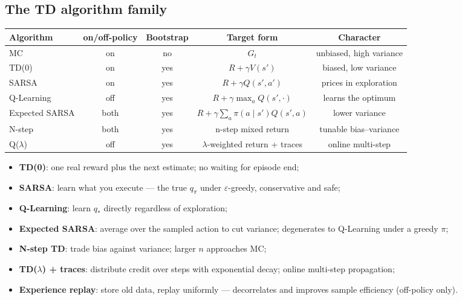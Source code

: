 \documentclass{article}
\begin{document}
\subsection*{The TD algorithm family}

\begin{center}
\small
\begin{tabular}{lcccc}
\toprule
Algorithm & on/off-policy & Bootstrap & Target form & Character \\
\midrule
MC & on & no & $G_t$ & unbiased, high variance \\
TD(0) & on & yes & $R+\gamma V(s')$ & biased, low variance \\
SARSA & on & yes & $R+\gamma Q(s',a')$ & prices in exploration \\
Q-Learning & off & yes & $R+\gamma\max_a Q(s',\cdot)$ & learns the optimum \\
Expected SARSA & both & yes & $R+\gamma\sum_a\pi(a\mid s')Q(s',a)$ & lower variance \\
N-step & both & yes & n-step mixed return & tunable bias--variance \\
Q($\lambda$) & off & yes & $\lambda$-weighted return + traces & online multi-step \\
\bottomrule
\end{tabular}
\end{center}

\begin{itemize}
  \item \textbf{TD(0)}: one real reward plus the next estimate; no waiting for episode end;
  \item \textbf{SARSA}: learn what you execute --- the true $q_\pi$ under $\varepsilon$-greedy, conservative and safe;
  \item \textbf{Q-Learning}: learn $q_*$ directly regardless of exploration;
  \item \textbf{Expected SARSA}: average over the sampled action to cut variance; degenerates to Q-Learning under a greedy $\pi$;
  \item \textbf{N-step TD}: trade bias against variance; larger $n$ approaches MC;
  \item \textbf{TD($\lambda$) + traces}: distribute credit over steps with exponential decay; online multi-step propagation;
  \item \textbf{Experience replay}: store old data, replay uniformly --- decorrelates and improves sample efficiency (off-policy only).
\end{itemize}
\end{document}
